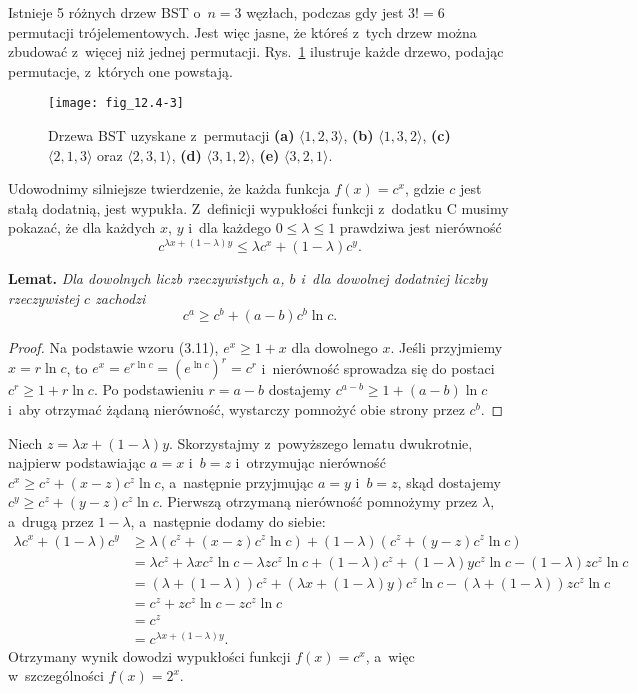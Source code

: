 \exercise %
Istnieje 5 różnych drzew BST o~$n=3$ węzłach, podczas gdy jest $3!=6$ permutacji trójelementowych.
Jest więc jasne, że któreś z~tych drzew można zbudować z~więcej niż jednej permutacji.
Rys.~\ref{fig:12.4-3} ilustruje każde drzewo, podając permutacje, z~których one powstają.
\begin{figure}[ht]
	\begin{center}
		\texttt{[image: fig\_12.4-3]}
	\end{center}
	\caption{Drzewa BST uzyskane z~permutacji {\sffamily\bfseries(a)} $\langle1,2,3\rangle$,
{\sffamily\bfseries(b)} $\langle1,3,2\rangle$,
{\sffamily\bfseries(c)} $\langle2,1,3\rangle$ oraz $\langle2,3,1\rangle$, {\sffamily\bfseries(d)} $\langle3,1,2\rangle$, {\sffamily\bfseries(e)} $\langle3,2,1\rangle$.} \label{fig:12.4-3}
\end{figure}

\exercise %
Udowodnimy silniejsze twierdzenie, że każda funkcja $f(x)=c^x$, gdzie $c$ jest stałą dodatnią, jest wypukła.
Z~definicji wypukłości funkcji z~dodatku C musimy pokazać, że dla każdych $x$, $y$ i~dla każdego $0\le\lambda\le1$ prawdziwa jest nierówność
\[
	c^{\lambda x+(1-\lambda)y} \le \lambda c^x+(1-\lambda)c^y.
\]

\medskip
\noindent\textsf{\textbf{Lemat.}} \textit{Dla dowolnych liczb rzeczywistych\/ $a$,\/ $b$ i~dla dowolnej dodatniej liczby rzeczywistej\/ $c$ zachodzi
\[
	c^a \ge c^b+(a-b)c^b\ln c.
\]
}
\begin{proof}
Na podstawie wzoru (3.11), $e^x\ge1+x$ dla dowolnego $x$.
Jeśli przyjmiemy $x=r\ln c$, to $e^x=e^{r\ln c}=(e^{\ln c})^r=c^r$ i~nierówność sprowadza się do postaci $c^r\ge1+r\ln c$.
Po podstawieniu $r=a-b$ dostajemy $c^{a-b}\ge1+(a-b)\ln c$ i~aby otrzymać żądaną nierówność, wystarczy pomnożyć obie strony przez $c^b$.
\end{proof}

Niech $z=\lambda x+(1-\lambda)y$.
Skorzystajmy z~powyższego lematu dwukrotnie, najpierw podstawiając $a=x$ i~$b=z$ i~otrzymując nierówność $c^x\ge c^z+(x-z)c^z\ln c$, a~następnie przyjmując $a=y$ i~$b=z$, skąd dostajemy $c^y\ge c^z+(y-z)c^z\ln c$.
Pierwszą otrzymaną nierówność pomnożymy przez $\lambda$, a~drugą przez $1-\lambda$, a~następnie dodamy do siebie:
\begin{align*}
	\lambda c^x+(1-\lambda)c^y &\ge \lambda(c^z+(x-z)c^z\ln c)+(1-\lambda)(c^z+(y-z)c^z\ln c) \\
	&= \lambda c^z+\lambda xc^z\ln c-\lambda zc^z\ln c+(1-\lambda)c^z+(1-\lambda)yc^z\ln c-(1-\lambda)zc^z\ln c \\
	&= (\lambda+(1-\lambda))c^z+(\lambda x+(1-\lambda)y)c^z\ln c-(\lambda+(1-\lambda))zc^z\ln c \\
	&= c^z+zc^z\ln c-zc^z\ln c \\
	&= c^z \\
	&= c^{\lambda x+(1-\lambda)y}.
\end{align*}
Otrzymany wynik dowodzi wypukłości funkcji $f(x)=c^x$, a~więc w~szczególności $f(x)=2^x$.

